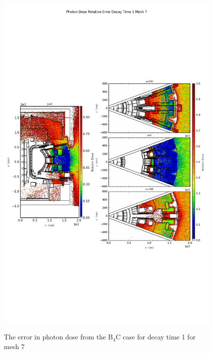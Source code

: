 \begin{figure}[ht!]
\centering
\includegraphics[trim={0cm 9cm 0cm 10cm},clip,scale=0.75]{../plots/final_model_nob4c/Photon_Dose_Relative_Error_Decay_Time_1_Mesh_7.png}
\label{fig:photons_dc1_no4bc_m7_error}
\caption{The error in photon dose from the B$_4$C case for decay time 1 for mesh 7}
\end{figure}
